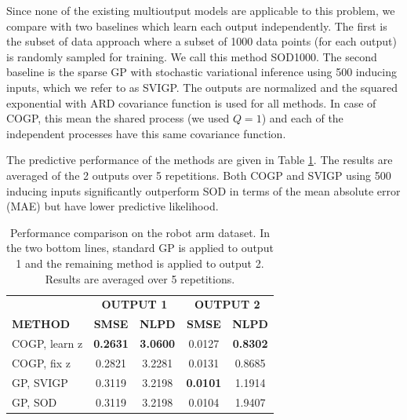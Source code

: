 Since none of the existing multioutput models are applicable to this problem, we compare with two baselines which learn each output independently.
The first is the subset of data approach where a subset of 1000 data points (for each output) is randomly sampled for training. 
We call this method SOD1000.
The second baseline is the sparse GP with stochastic variational inference \citet{hensmangaussian} using 500 inducing inputs, which we refer to as SVIGP.
The outputs are normalized and the squared exponential with ARD covariance function is used for all methods.
In case of COGP, this mean the shared process (we used $Q = 1$) and each of the independent processes have this same covariance function.

The predictive performance of the methods are given in Table \ref{tab:robotarm}.
The results are averaged of the 2 outputs over 5 repetitions.
Both COGP and SVIGP using 500 inducing inputs significantly outperform SOD in terms of the mean absolute error (MAE) but have lower predictive likelihood.

\begin{table}[t]
\caption{Performance comparison on the robot arm dataset. In the two bottom lines, standard GP is applied to output 1 and the remaining method is applied to output 2. Results are averaged over 5 repetitions.}
\label{tab:robotarm}
\begin{center}
\begin{tabular}{lcccc}
\toprule
& \multicolumn{2}{c}{\textbf{OUTPUT 1}} & \multicolumn{2}{c}{\textbf{OUTPUT 2}} \\ \cmidrule(r){2-5}
\textbf{METHOD} & \textbf{SMSE} & \textbf{NLPD} & \textbf{SMSE} & \textbf{NLPD}\\ 
 \midrule
COGP, learn z & \textbf{0.2631} & \textbf{3.0600} & 0.0127 & \textbf{0.8302} \\
COGP, fix z & 0.2821& 3.2281 & 0.0131 & 0.8685 \\
GP, SVIGP & 0.3119 & 3.2198 & \textbf{0.0101} & 1.1914 \\
GP, SOD & 0.3119 & 3.2198 & 0.0104 & 1.9407 \\
\bottomrule
\end{tabular}
\end{center}
\end{table}

